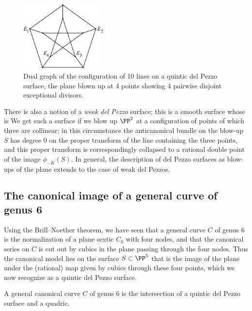 \begin{figure}
\centerline {\includegraphics[height=1.4in]{main/Fig11-5}}
\caption{Dual graph of the configuration of 10 lines on a quintic del
Pezzo surface, the plane blown up
at 4 points showing 4 pairwise disjoint exceptional divisors.}
\label{dual graph of the configuration of 10 lines on a quintic del
Pezzo surface}
\end{figure}

There is also a notion of a \emph{weak del Pezzo} 
%
surface; this is a
smooth surface whose 
%
 is 
%
We get such a surface if we blow up $\PP^2$ at a configuration
of points of which three are collinear; in this circumstance the
anticanonical bundle on the blow-up $S$ has degree 0 on the proper
transform of the line containing the three points, and this proper
transform is correspondingly collapsed to a rational double point of the
image $\phi_{-K}(S)$. In general, the description of del Pezzo surfaces
as blow-ups of the plane extends to the case of weak del Pezzos.



\subsection{The canonical image of a general curve of genus 6}

Using the Brill--Noether theorem, we have seen that a general curve $C$
of genus 6 is the normalization of a plane sextic $C_0$ with four nodes,
and that the canonical series on $C$ is cut out by cubics in the plane
passing through the four nodes. Thus the canonical model lies on the
surface $S \subset \PP^5$ that is the image of the plane under the
(rational) map given by cubics through these four points, which we now
recognize as a quintic del Pezzo surface.

\begin{theorem}
A general canonical curve $C$ of genus 6 is the intersection of a quintic
del Pezzo surface and a quadric.
\end{theorem}

